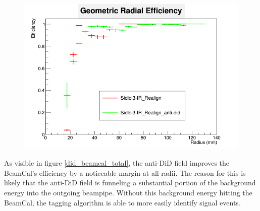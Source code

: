 \documentclass{report}
\begin{document}
                \begin{figure}[H]
                    \includegraphics[width=\textwidth]{RadialEfficiency_geometric_did}
                    \centering
                    \caption{}
                    \label{did_beamcal_geom}
                \end{figure}

                As visible in figure \ref{did_beamcal_total}, the anti-DiD field improves the BeamCal's efficiency by a noticeable margin at all radii. The reason for this is likely that the anti-DiD field is funneling a substantial portion of the background energy into the outgoing beampipe. Without this background energy hitting the BeamCal, the tagging algorithm is able to more easily identify signal events.
\end{document}

